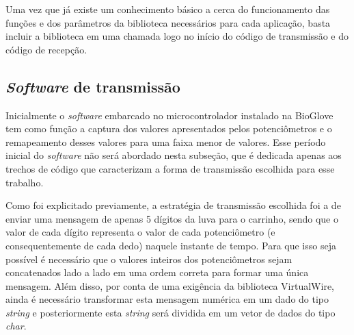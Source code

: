 \documentclass[
	12pt,				%
	openright,			%
	oneside,			%
	a4paper,			%
	english,			%
	brazil				%
	]{abntex2}
\begin{document}
		Uma vez que já existe um conhecimento básico a cerca do funcionamento das funções e dos parâmetros da biblioteca necessários para cada aplicação, basta incluir a biblioteca em uma chamada logo no início do código de transmissão e do código de recepção.



		\subsection{\textit{Software} de transmissão}

		Inicialmente o \textit{software} embarcado no microcontrolador instalado na BioGlove tem como função a captura dos valores apresentados pelos potenciômetros e o remapeamento desses valores para uma faixa menor de valores. Esse período inicial do \textit{software} não será abordado nesta subseção, que é dedicada apenas aos trechos de código que caracterizam a forma de transmissão escolhida para esse trabalho.

		Como foi explicitado previamente, a estratégia de transmissão escolhida foi a de enviar uma mensagem de apenas 5 dígitos da luva para o carrinho, sendo que o valor de cada dígito representa o valor de cada potenciômetro (e consequentemente de cada dedo) naquele instante de tempo. Para que isso seja possível é necessário que o valores inteiros dos potenciômetros sejam concatenados lado a lado em uma ordem correta para formar uma única mensagem. Além disso, por conta de uma exigência da biblioteca VirtualWire, ainda é necessário transformar esta mensagem numérica em um dado do tipo \textit{string} e posteriormente esta \textit{string} será dividida em um vetor de dados do tipo \textit{char}.	
		
\end{document}
